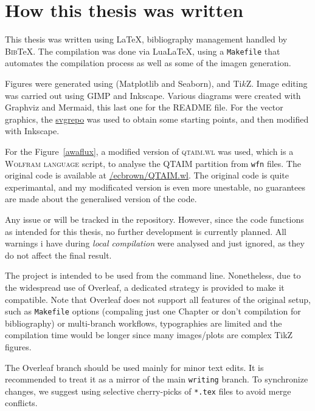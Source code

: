 \newpage
\section{How this thesis was written}\label{how_written}

This thesis was written using \LaTeX, bibliography management handled by
\textsc{Bib}\TeX{}. The compilation was done via Lua\LaTeX, using a
\texttt{Makefile} that automates the compilation process as well
as some of the imagen generation.

Figures were generated using \python (Matplotlib and Seaborn), and Ti$k$Z. Image
editing was carried out using GIMP and Inkscape. Various diagrams were created
with Graphviz and Mermaid, this last one for the README file. For the vector
graphics, the \href{https://www.svgrepo.com}{svgrepo} was used to obtain some
starting points, and then modified with Inkscape.

For the Figure~\ref{awaflux}, a modified version of \textsc{qtaim.wl} was used,
which is a \textsc{Wolfram language} script, to analyse the QTAIM partition
from \texttt{wfn} files. The original code is available at
\href{http://www.github.com/ecbrown/QTAIM.wl}{\faGithub/ecbrown/QTAIM.wl}. The
original code is quite experimantal, and my modificated version is even more
unestable, no guarantees are made about the generalised version of the code.

Any issue or \bug will be tracked in the repository. However,
since the code functions as intended for this thesis, no further development is
currently planned. All warnings i have during \emph{local compilation} were
analysed and just ignored, as they do not affect the final result.

The project is intended to be used from the command line. Nonetheless, due to
the widespread use of Overleaf, a dedicated strategy is provided to make it
compatible. Note that Overleaf does not support all features of the original
setup, such as \texttt{Makefile} options (compaling just one Chapter or don't compilation for
bibliography) or multi-branch workflows, typographies
are limited and the compilation time would be longer since many images/plots
are complex TikZ figures.

The Overleaf branch should be used mainly for minor text edits. It is
recommended to treat it as a mirror of the main \texttt{writing}
branch. To synchronize changes, we suggest using selective cherry-picks of
\texttt{*.tex} files to avoid merge conflicts.

